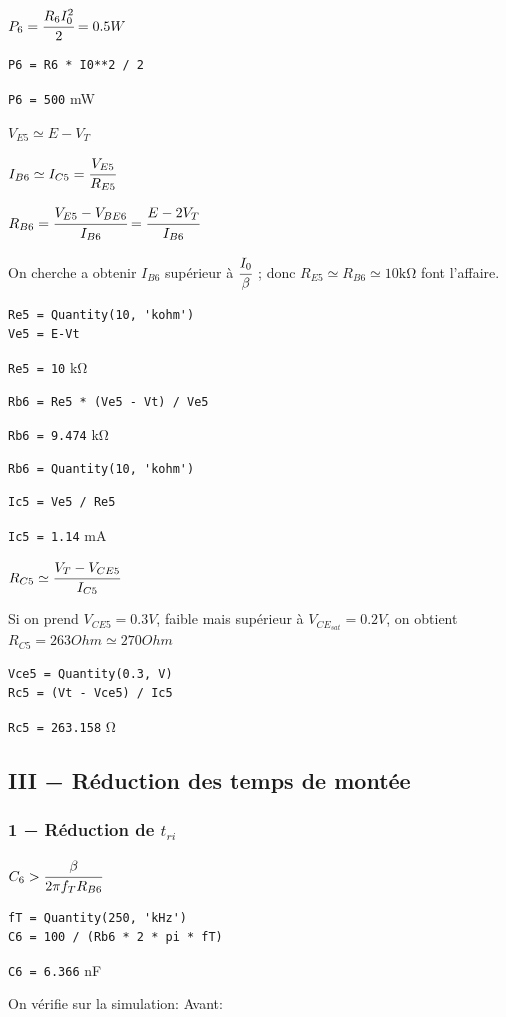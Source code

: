 $P_6=\cfrac{R_6I_0^2}{2}=0.5W$
\begin{verbatim}
P6 = R6 * I0**2 / 2
\end{verbatim}
\verb|P6 = 500| \si{\milli\watt}

$V_{E5}\simeq E-V_T$

$I_{B6}\simeq I_{C5}=\cfrac{V_{E5}}{R_{E5}}$

$R_{B6}=\cfrac{V_{E5}-V_{BE6}}{I_{B6}}=\cfrac{E-2V_T}{I_{B6}}$

On cherche a obtenir $I_{B6}$ supérieur à $\cfrac{I_0}{\beta}$ ; donc $R_{E5}\simeq R_{B6}\simeq 10\si{\kilo\ohm}$ font l’affaire.
\begin{verbatim}
Re5 = Quantity(10, 'kohm')
Ve5 = E-Vt
\end{verbatim}
\verb|Re5 = 10| \si{\kilo\ohm}
\begin{verbatim}
Rb6 = Re5 * (Ve5 - Vt) / Ve5
\end{verbatim}
\verb|Rb6 = 9.474| \si{\kilo\ohm}
\begin{verbatim}
Rb6 = Quantity(10, 'kohm')
\end{verbatim}
\begin{verbatim}
Ic5 = Ve5 / Re5
\end{verbatim}
\verb|Ic5 = 1.14| \si{\milli\ampere}

$R_{C5}\simeq\cfrac{V_T-V_{CE5}}{I_{C5}}$

Si on prend $V_{CE5} = 0.3V$, faible mais supérieur à $V_{CE_{sat}}=0.2V$, on obtient $R_{C5}=263 Ohm \simeq 270 Ohm$
\begin{verbatim}
Vce5 = Quantity(0.3, V)
Rc5 = (Vt - Vce5) / Ic5
\end{verbatim}
\verb|Rc5 = 263.158| \si\ohm
\subsection{III − Réduction des temps de montée}
\subsubsection{1 − Réduction de $t_{ri}$}

$C_6 > \cfrac{\beta}{2\pi f_TR_{B6}}$
\begin{verbatim}
fT = Quantity(250, 'kHz')
C6 = 100 / (Rb6 * 2 * pi * fT)
\end{verbatim}
\verb|C6 = 6.366| \si{\nano\farad}

On vérifie sur la simulation: Avant:

